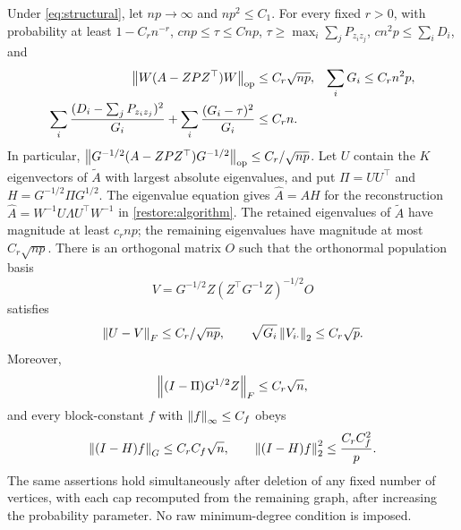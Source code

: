 \begin{proposition}\label{prop:sparse-floor}
Under \eqref{eq:structural}, let $np\to\infty$ and $np^2\le C_1$.
For every fixed $r>0$, with probability at least $1-C_rn^{-r}$,
$c{np}\le\tau\le C{np}$, $\tau\ge\max_i\sum_jP_{z_i z_j}$,
$c{n^2p}\le\sum_iD_i$, and
\begin{align}
 \left\lVert W(A-{ZPZ^\top})W\right\rVert_{\mathrm{op}}&\le C_r\sqrt {np},
 &\sum_iG_i&\le C_r{n^2p},\label{eq:floor-noise}\\
 \sum_i\frac{(D_i-\sum_jP_{z_i z_j})^2}{G_i}
 +\sum_i\frac{(G_i-\tau)^2}{G_i}
 &\le C_rn.\label{eq:floor-degree-energy}
\end{align}
In particular,
$\left\lVert G^{-1/2}(A-{ZPZ^\top})G^{-1/2}\right\rVert_{\mathrm{op}}\le C_r/\sqrt {np}$.
Let $U$ contain the $K$ eigenvectors of $\widetilde A$ with largest absolute
eigenvalues, and put $\Pi=UU^\top$ and $H=G^{-1/2}\Pi G^{1/2}$.
The eigenvalue equation gives $\widehat A=AH$ for the reconstruction
$\widehat A=W^{-1}U\Lambda U^\top W^{-1}$ in \cref{restore:algorithm}.
The retained eigenvalues of $\widetilde A$ have magnitude at least $c_r{np}$;
the remaining eigenvalues have magnitude at most $C_r\sqrt {np}$.
There is an orthogonal matrix $O$ such that the orthonormal population
basis
\[
 V=G^{-1/2}Z(Z^\top G^{-1}Z)^{-1/2}O
\]
satisfies
\[
 \left\lVert U-V\right\rVert_F\le C_r/\sqrt {np},
 \qquad \sqrt{G_i}\left\lVert V_{i\cdot}\right\rVert_2\le C_r\sqrt{p}.
\]
Moreover,
\begin{equation}\label{eq:floor-block-residual}
 \left\lVert(I-\Pi)G^{1/2}Z\right\rVert_F\le C_r\sqrt n,
\end{equation}
and every block-constant $f$ with $\left\lVert f\right\rVert_\infty\le C_f$ obeys
\begin{equation}\label{eq:floor-weighted-errors}
 \left\lVert(I-H)f\right\rVert_G\le C_rC_f\sqrt n,\qquad
 \left\lVert(I-H)f\right\rVert_2^2\le \frac{C_rC_f^2}{p}.
\end{equation}
The same assertions hold simultaneously after deletion of any fixed
number of vertices, with each cap recomputed from the remaining graph,
after increasing the probability parameter. No raw minimum-degree
condition is imposed.
\end{proposition}

